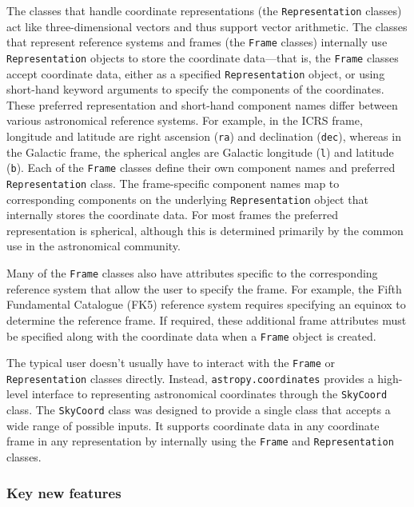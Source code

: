 \documentclass[modern]{aastex61}
\begin{document}
The classes that handle coordinate representations (the \texttt{Representation}
classes) act like three-dimensional vectors and thus support vector arithmetic.
The classes that represent reference systems and frames (the \texttt{Frame}
classes) internally use \texttt{Representation} objects to store the coordinate
data---that is, the \texttt{Frame} classes accept coordinate data, either as a
specified \texttt{Representation} object, or using short-hand keyword arguments
to specify the components of the coordinates.
These preferred representation and short-hand component names differ between
various astronomical reference systems.
For example, in the ICRS frame, longitude and latitude are right ascension
(\texttt{ra}) and declination (\texttt{dec}), whereas in the Galactic frame, the
spherical angles are Galactic longitude (\texttt{l}) and latitude (\texttt{b}).
Each of the \texttt{Frame} classes define their own component names and
preferred \texttt{Representation} class.
The frame-specific component names map to corresponding components on the
underlying \texttt{Representation} object that internally stores the coordinate
data.
For most frames the preferred representation is spherical, although this is determined primarily by the common use in the astronomical community.

Many of the \texttt{Frame} classes also have attributes specific to the
corresponding reference system that allow the user to specify the frame.
For example, the Fifth Fundamental Catalogue (FK5) reference system requires
specifying an equinox to determine the reference frame.
If required, these additional frame attributes must be specified along with the
coordinate data when a \texttt{Frame} object is created.

The typical user doesn't usually have to interact with the \texttt{Frame} or
\texttt{Representation} classes directly.
Instead, \texttt{astropy.coordinates} provides a high-level interface to
representing astronomical coordinates through the \texttt{SkyCoord} class.
The \texttt{SkyCoord} class was designed to provide a single class that
accepts a wide range of possible inputs.  It supports coordinate data in any
coordinate frame in any representation by internally using the \texttt{Frame} and \texttt{Representation} classes.

\subsubsection{Key new features}
\end{document}
